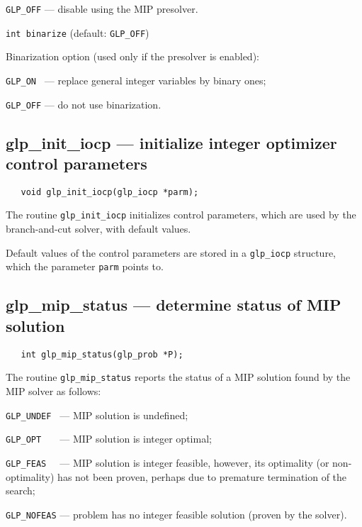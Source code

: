 \verb|GLP_OFF| --- disable using the MIP presolver.

\newpage

{\tt int binarize} (default: {\tt GLP\_OFF})

Binarization option (used only if the presolver is enabled):

\verb|GLP_ON | --- replace general integer variables by binary ones;

\verb|GLP_OFF| --- do not use binarization.

\subsection{glp\_init\_iocp --- initialize integer optimizer control
parameters}

\synopsis

\begin{verbatim}
   void glp_init_iocp(glp_iocp *parm);
\end{verbatim}

\description

The routine \verb|glp_init_iocp| initializes control parameters, which
are used by the branch-and-cut solver, with default values.

Default values of the control parameters are stored in
a \verb|glp_iocp| structure, which the parameter \verb|parm| points to.

\subsection{glp\_mip\_status --- determine status of MIP solution}

\synopsis

\begin{verbatim}
   int glp_mip_status(glp_prob *P);
\end{verbatim}

\returns

The routine \verb|glp_mip_status| reports the status of a MIP solution
found by the MIP solver as follows:

\verb|GLP_UNDEF | --- MIP solution is undefined;

\verb|GLP_OPT   | --- MIP solution is integer optimal;

\verb|GLP_FEAS  | --- MIP solution is integer feasible, however, its
optimality (or non-optimality) has not been proven, perhaps due to
premature termination of the search;

\verb|GLP_NOFEAS| --- problem has no integer feasible solution (proven
by the solver).

